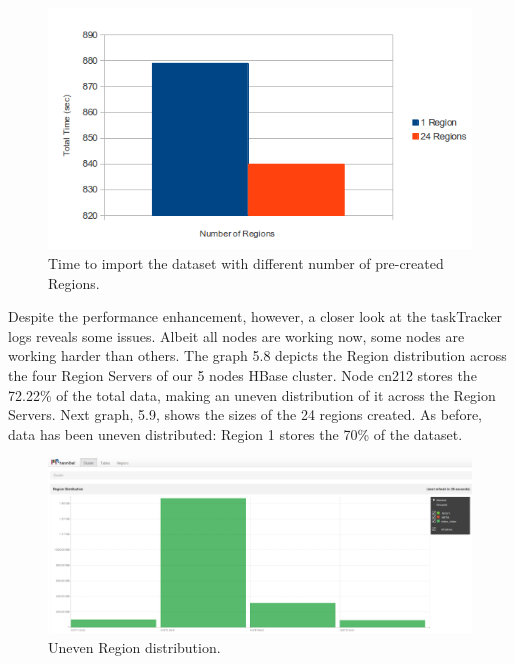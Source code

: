 \begin{figure}[htb]
\centering
\includegraphics[width=1\textwidth]{./images/1-24regions.png}
\caption{Time to import the dataset with different number of pre-created Regions.} \label{fig:regions}
\end{figure}

Despite the performance enhancement, however, a closer look at the taskTracker logs reveals some issues. Albeit all nodes are working now, some nodes are working harder than others. The graph 5.8 depicts the Region distribution across the four Region Servers of our 5 nodes HBase cluster. Node cn212 stores the 72.22\% of the total data, making an uneven distribution of it across the Region Servers. Next graph, 5.9, shows the sizes of the 24 regions created. As before, data has been uneven distributed: Region 1 stores the 70\% of the dataset.




\begin{figure}[htb]
\centering
\includegraphics[width=1\textwidth]{./images/regiondistribution.png}
\caption{Uneven Region distribution.} \label{fig:regionDistribution}
\end{figure}



